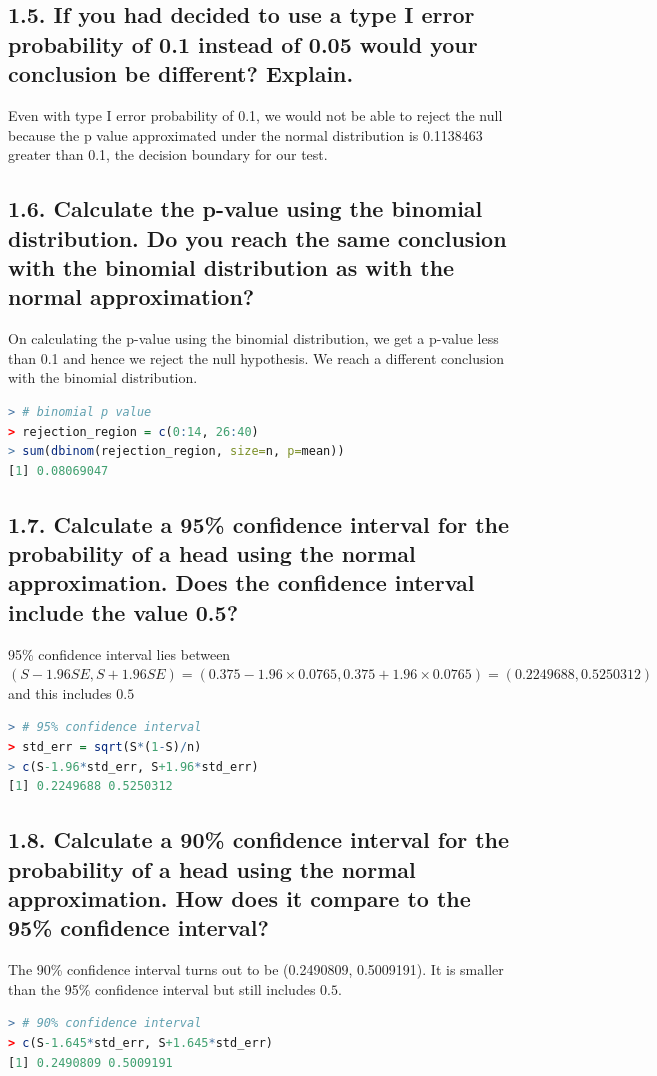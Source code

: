 \documentclass[11pt]{article}
\begin{document}
\subsection*{1.5. If you had decided to use a type I error probability of 0.1 instead of 0.05 would your conclusion be different? Explain.}
Even with type I error probability of 0.1, we would not be able to reject the null because the p value approximated under the normal distribution is 0.1138463 greater than 0.1, the decision boundary for our test.

\subsection*{1.6. Calculate the p-value using the binomial distribution. Do you reach the same conclusion with the binomial distribution as with the normal approximation?}
On calculating the p-value using the binomial distribution, we get a p-value less than 0.1 and hence we reject the null hypothesis. We reach a different conclusion with the binomial distribution.
\begin{lstlisting}[language=R]
> # binomial p value
> rejection_region = c(0:14, 26:40)
> sum(dbinom(rejection_region, size=n, p=mean))
[1] 0.08069047
\end{lstlisting}


\subsection*{1.7. Calculate a 95\% confidence interval for the probability of a head using the normal approximation. Does the confidence interval include the value 0.5?}
95\% confidence interval lies between $(S - 1.96 SE, S + 1.96 SE) = (0.375-1.96\times0.0765, 0.375+1.96\times0.0765) = (0.2249688, 0.5250312)$ and this includes $0.5$

\begin{lstlisting}[language=R]
> # 95% confidence interval
> std_err = sqrt(S*(1-S)/n)
> c(S-1.96*std_err, S+1.96*std_err)
[1] 0.2249688 0.5250312
\end{lstlisting}

\subsection*{1.8. Calculate a 90\% confidence interval for the probability of a head using the normal approximation. How does it compare to the 95\% confidence interval?}
The 90\% confidence interval turns out to be (0.2490809, 0.5009191). It is smaller than the 95\% confidence interval but still includes $0.5$.
\begin{lstlisting}[language=R]
> # 90% confidence interval
> c(S-1.645*std_err, S+1.645*std_err)
[1] 0.2490809 0.5009191
\end{lstlisting}
\end{document}
